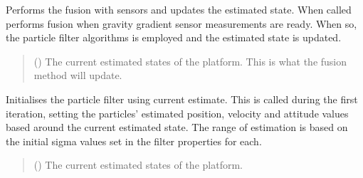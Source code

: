 \documentclass[letterpaper,10pt,english]{sphinxmanual}
\begin{document}
\begin{fulllineitems}
\begin{fulllineitems}
\label{\detokenize{modules/quantum/gravity_gradient:qnav.quantum.gravity_gradient.GravityGradientPF.perform_fusion}}
\pysigstartsignatures
{}
\pysigstopsignatures
\sphinxAtStartPar
Performs the fusion with sensors and updates the estimated state.
When called performs fusion when gravity gradient sensor
measurements are ready. When so, the particle filter algorithms is
employed and the estimated state is updated.
\begin{quote}\begin{description}
\sphinxAtStartPar
{} ({\hyperref[\detokenize{modules/estimation/state:qnav.estimation.state.EstimatedState}]{}}) \textendash{} The current estimated states of the platform.
This is what the fusion method will update.

\end{description}\end{quote}

\end{fulllineitems}


\begin{fulllineitems}
\label{\detokenize{modules/quantum/gravity_gradient:qnav.quantum.gravity_gradient.GravityGradientPF.init_particle_filter}}
\pysigstartsignatures
{}
\pysigstopsignatures
\sphinxAtStartPar
Initialises the particle filter using current estimate.
This is called during the first iteration, setting the particles’
estimated position, velocity and attitude values based around the
current estimated state. The range of estimation is based on the
initial sigma values set in the filter properties for each.
\begin{quote}\begin{description}
\sphinxAtStartPar
{} ({\hyperref[\detokenize{modules/estimation/state:qnav.estimation.state.EstimatedState}]{}}) \textendash{} The current estimated states of the platform.


\end{description}
\end{quote}
\end{fulllineitems}
\end{fulllineitems}
\end{document}
